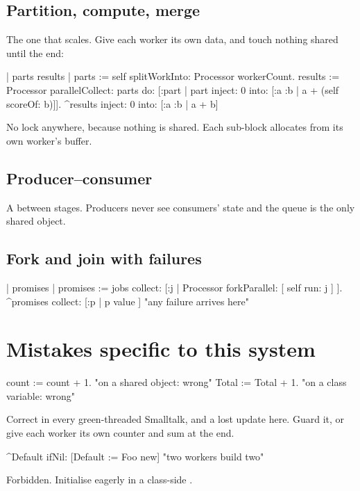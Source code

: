 \subsection{Partition, compute, merge}

The one that scales. Give each worker its own data, and touch nothing shared
until the end:

\begin{st}
| parts results |
parts := self splitWorkInto: Processor workerCount.
results := Processor parallelCollect: parts do: [:part |
    part inject: 0 into: [:a :b | a + (self scoreOf: b)]].
^results inject: 0 into: [:a :b | a + b]
\end{st}

No lock anywhere, because nothing is shared. Each sub-block allocates from its
own worker's buffer.

\subsection{Producer--consumer}

A  between stages. Producers never see consumers' state and
the queue is the only shared object.

\subsection{Fork and join with failures}

\begin{st}
| promises |
promises := jobs collect: [:j | Processor forkParallel: [ self run: j ] ].
^promises collect: [:p | p value ]     "any failure arrives here"
\end{st}

\section{Mistakes specific to this system}

\begin{stwarn}
\begin{st}
count := count + 1.        "on a shared object: wrong"
Total := Total + 1.        "on a class variable: wrong"
\end{st}
Correct in every green-threaded Smalltalk, and a lost update here. Guard it,
or give each worker its own counter and sum at the end.
\end{stwarn}

\begin{stwarn}
\begin{st}
^Default ifNil: [Default := Foo new]     "two workers build two"
\end{st}
Forbidden. Initialise eagerly in a class-side .
\end{stwarn}

